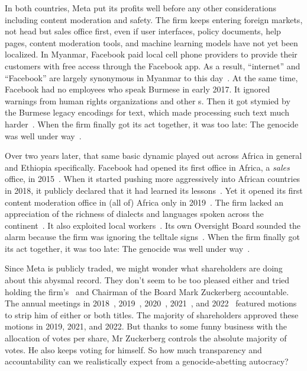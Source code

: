 In both countries, Meta put its profits well before any other considerations
including content moderation and safety. The firm keeps entering foreign
markets, not head but sales office first, even if user interfaces, policy
documents, help pages, content moderation tools, and machine learning models
have not yet been localized. In Myanmar, Facebook paid local cell phone
providers to provide their customers with free access through the Facebook app.
As a result, ``internet'' and ``Facebook'' are largely synonymous in Myanmar to
this day~\cite{Strom2016}. At the same time, Facebook had no employees who speak
Burmese in early 2017. It ignored warnings from human rights organizations and
other \NGO{}s. Then it got stymied by the Burmese legacy encodings for text,
which made processing such text much harder~\cite{LaGrowPruzan2019,Wade2022}.
When the firm finally got its act together, it was too late: The genocide was
well under way~\cite{McLaughlin2018,MilkoOrtutay2022,Mozur2018,Ortutay2022}.

Over two years later, that same basic dynamic played out across Africa in
general and Ethiopia specifically. Facebook had opened its first office in
Africa, a \emph{sales} office, in 2015~\cite{Wagner2015}. When it started
pushing more aggressively into African countries in 2018, it publicly declared
that it had learned its lessons~\cite{Tiku2018}. Yet it opened its first content
moderation office in (all of) Africa only in 2019~\cite{Agutu2019}. The firm
lacked an appreciation of the richness of dialects and languages spoken across
the continent~\cite{FickDave2019,JacksonTownsendea2022,Madung2021}. It also
exploited local workers~\cite{AlSibai2022,Perrigo2022,Perrigo2023}. Its own
Oversight Board sounded the alarm because the firm was ignoring the telltale
signs~\cite{Faife2021}. When the firm finally got its act together, it was too
late: The genocide was well under
way~\cite{Allen2022,Gilbert2020,GlobalWitness2022,Ilori2020,Malik2022,ElliottChristopherea2021,ZelalemGuest2021,RobinsEarly2021}.

Since Meta is publicly traded, we might wonder what shareholders are doing about
this abysmal record. They don't seem to be too pleased either and tried holding
the firm's \CEO\ and Chairman of the Board Mark Zuckerberg accountable. The
annual meetings in 2018~\cite{Butler2018}, 2019~\cite{Sumagaysay2019},
2020~\cite{McRitchie2020}, 2021~\cite{Nix2021}, and 2022~\cite{WatersAgnew2022}
featured motions to strip him of either or both titles. The majority of
shareholders approved these motions in 2019, 2021, and 2022. But thanks to some
funny business with the allocation of votes per share, Mr Zuckerberg controls
the absolute majority of votes. He also keeps voting for himself. So how much
transparency and accountability can we realistically expect from a
genocide-abetting autocracy?
